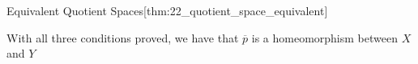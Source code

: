 \begin{thmBox}{Equivalent Quotient Spaces}[thm:22_quotient_space_equivalent]
\begin{proofBox}
        \baseSkip

        With all three conditions proved, we have that \( \overline{ p } \) is 
        a homeomorphism between \( X \) and \( Y \)
    \end{proofBox}
\end{thmBox}